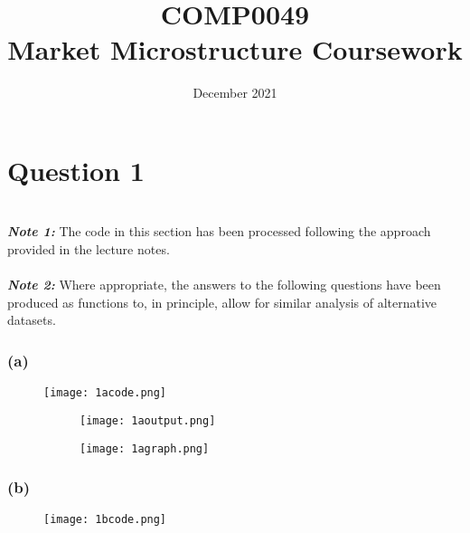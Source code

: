 \documentclass{article}
\title{\textbf{COMP0049 \\ Market Microstructure Coursework}}
\date{December 2021}
\begin{document}
\maketitle

\newpage %

\section*{Question 1}

\textit{\textbf{\\Note 1:}} The code in this section has been processed following the approach provided in the lecture notes. \\
\textit{\textbf{\\Note 2:}} Where appropriate, the answers to the following questions have been produced as functions to, in principle, allow for similar analysis of alternative datasets. 

\subsubsection*{(a)}

\begin{figure}[h]
\texttt{[image: 1acode.png]}
\centering
\end{figure}

\begin{figure}[h]

\begin{subfigure}{0.5\textwidth}
\texttt{[image: 1aoutput.png]}
\end{subfigure}
\begin{subfigure}{0.5\textwidth}
\texttt{[image: 1agraph.png]}
\end{subfigure}

\end{figure}
\newpage
\subsubsection*{(b)}

\begin{figure}[h]
\texttt{[image: 1bcode.png]}
\centering
\end{figure}
\end{document}
